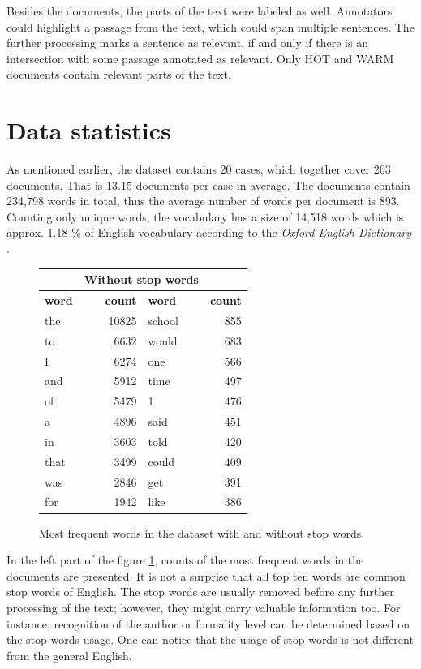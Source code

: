 \documentclass[
  digital, %
  notable,   %
  nolof,     %
  nolot,     %
]{fithesis3}
\begin{document}
Besides the documents, the parts of the text were labeled as well.
Annotators could highlight a passage from the text, which could span multiple sentences.
The further processing marks a sentence as relevant, if and only if there is an intersection with some passage annotated as relevant.
Only HOT and WARM documents contain relevant parts of the text.

\section{Data statistics}
As mentioned earlier, the dataset contains 20 cases, which together cover 263 documents. That is $13.15$ documents per case in average.
The documents contain 234,798 words in total, thus the average number of words per document is 893.
Counting only unique words, the vocabulary has a size of 14,518 words which is approx. 1.18 \% of English vocabulary according to the \textit{Oxford English Dictionary}  \cite{oxfordDictionaries}.

\begin{figure}[h]
\centering
\caption{Most frequent words in the dataset with and without stop words.}
\label{fig:most_frequent}
\footnotesize
\begin{tabular}{|l|r||l|r|}\hline
\rowcolor{orange!50}
\multicolumn{2}{|c||}{\makebox[9em]{\textbf{All words}}} & \multicolumn{2}{|c|}{\textbf{Without stop words}} \\\hline\hline
\textbf{word} & \textbf{count} & \textbf{word} & \textbf{count} \\\hline\hline
the & 10825 & school & 855 \\\hline
to & 6632 & would & 683 \\\hline
I & 6274 & one & 566 \\\hline
and & 5912 & time & 497 \\\hline
of & 5479 & 1 & 476 \\\hline
a & 4896 & said & 451 \\\hline
in & 3603 & told & 420 \\\hline
that & 3499 & could & 409 \\\hline
was & 2846 & get & 391 \\\hline
for & 1942 & like & 386 \\\hline
\end{tabular}
\normalsize
\end{figure}

In the left part of the figure \ref{fig:most_frequent}, counts of the most frequent words in the documents are presented.
It is not a surprise that all top ten words are common stop words of English.
The stop words are usually removed before any further processing of the text; however, they might carry valuable information too.
For instance, recognition of the author or formality level can be determined based on the stop words usage.
One can notice that the usage of stop words is not different from the general English.
\end{document}
